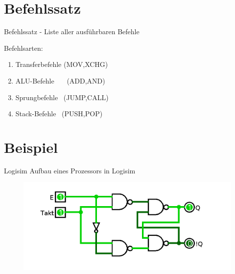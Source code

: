 \documentclass{beamer}
\begin{document}
\fi

\section{Befehlssatz}
\begin{frame}[t]{Befehlssatz}
- Liste aller ausf\"uhrbaren Befehle\newline\par
Befehlsarten:
\center
\begin{enumerate}
\item{Transferbefehle  (MOV,XCHG)}
\item{ALU-Befehle \ \ \ (ADD,AND)}
\item{Sprungbefehle  \  (JUMP,CALL)}
\item{Stack-Befehle \ (PUSH,POP)}
\end{enumerate}
\end{frame}



\section{Beispiel}
\begin{frame}{Logisim}
Aufbau eines Prozessors in Logisim
\begin{figure}[!htb]
\centering
\includegraphics[scale=0.30]{flipflop}
\end{figure}
\end{frame}
\end{document}
